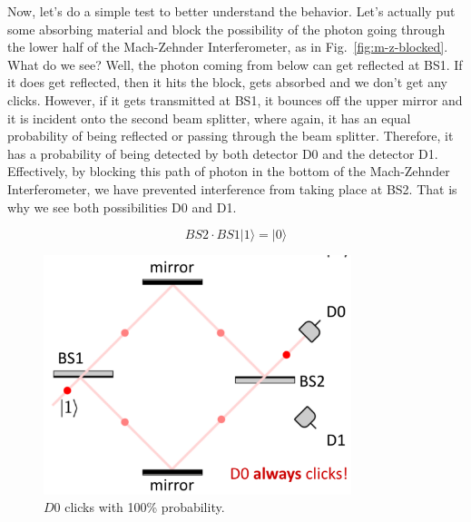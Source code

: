 Now, let's do a simple test to better understand the behavior. Let's actually put some absorbing material and block the possibility of the photon going through the lower half of the Mach-Zehnder Interferometer, as in Fig.~\ref{fig:m-z-blocked}. What do we see? Well, the photon coming from below can get reflected at BS1. If it does get reflected, then it hits the block, gets absorbed and we don't get any clicks. However, if it gets transmitted at BS1, it bounces off the upper mirror and it is incident onto the second beam splitter, where again, it has an equal probability of being reflected or passing through the beam splitter. Therefore, it has a probability of being detected by both detector D0 and the detector D1. Effectively, by blocking this path of photon in the bottom of the Mach-Zehnder Interferometer, we have prevented interference from taking place at BS2. That is why we see both possibilities D0 and D1.

\begin{equation}
B S 2 \cdot B S 1|1\rangle=|0\rangle
\end{equation}
\fi

\begin{figure}[H]
   \centering
    \includegraphics[width=0.8\textwidth]{lesson6/d0_always_clicks.pdf}
    
        \caption{$D0$ clicks with 100\% probability.}
    \label{fig:m-z-d0}
    
\end{figure}

